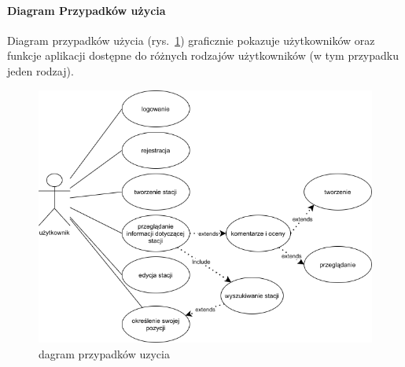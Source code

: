 \paragraph{Diagram Przypadków użycia\newline}
Diagram przypadków użycia (rys.~\ref{fig:usecasediagram}) graficznie pokazuje użytkowników oraz funkcje aplikacji dostępne do różnych rodzajów użytkowników (w tym przypadku jeden rodzaj).
\begin{figure}[ht]
    \centering
        \includegraphics[width=0.7\linewidth]{rys02/use_case_diagram.png}
        \caption{dagram przypadków uzycia \cite{diagrams_net}}
    \label{fig:usecasediagram}
\end{figure}

